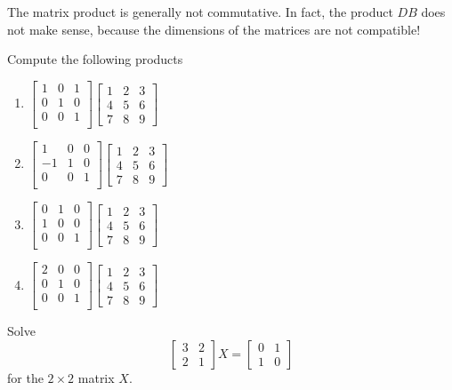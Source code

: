 \begin{remark}
	The matrix product is generally not commutative. In fact, the product $DB$ does not make sense, because the dimensions of the matrices are not compatible!
\end{remark}
\exercises
\begin{exerciselist}
	\item Compute the following products \begin{enumerate}[label=(\alph*)]
		\item $\begin{bmatrix}
			1 & 0 & 1\\
			0 & 1 & 0 \\
			0 & 0 & 1\\
		\end{bmatrix}\begin{bmatrix}
			1&2&3\\4&5&6\\7&8&9
		\end{bmatrix}$
		\item $\begin{bmatrix}
			1 & 0 & 0\\
			-1 & 1 & 0 \\
			0 & 0 & 1\\
		\end{bmatrix}\begin{bmatrix}
			1&2&3\\4&5&6\\7&8&9
		\end{bmatrix}$
		\item $\begin{bmatrix}
			0 & 1 & 0\\
			1 & 0 & 0 \\
			0 & 0 & 1\\
		\end{bmatrix}\begin{bmatrix}
			1&2&3\\4&5&6\\7&8&9
		\end{bmatrix}$
		\item $\begin{bmatrix}
			2 & 0 & 0\\
			0 & 1 & 0 \\
			0 & 0 & 1\\
		\end{bmatrix}\begin{bmatrix}
			1&2&3\\4&5&6\\7&8&9
		\end{bmatrix}$
	\end{enumerate}
	 \item Solve \[
		\begin{bmatrix}
			3&2\\2&1
		\end{bmatrix}X = \begin{bmatrix}
			0&1\\1&0
		\end{bmatrix}
		\] for the $2\times 2$ matrix $X$.
	

\end{exerciselist}
